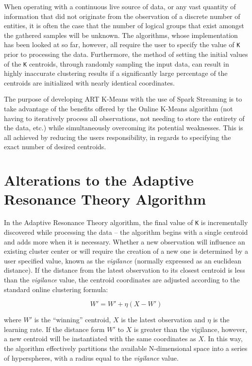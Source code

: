 \documentclass{l4proj}
\begin{document}
When operating with a continuous live source of data, or any vast quantity of information that did not originate from the observation of a discrete number of entities, it is often the case that the number of logical groups that exist amongst the gathered samples will be unknown. The algorithms, whose implementation has been looked at so far, however, all require the user to specify the value of \texttt{K} prior to processing the data. Furthermore, the method of setting the initial values of the \texttt{K} centroids, through randomly sampling the input data, can result in highly inaccurate clustering results if a significantly large percentage of the centroids are  initialized with nearly identical coordinates\cite{PlusPlus}.

The purpose of developing ART K-Means with the use of Spark Streaming is to take advantage of the benefits offered by the Online K-Means algorithm (not having to iteratively process all observations, not needing to store the entirety of the data, etc.) while simultaneously overcoming its potential weaknesses. This is all achieved by reducing the users responsibility, in regards to specifying the exact number of desired centroids.

\section{Alterations to the Adaptive Resonance Theory Algorithm}

In the Adaptive Resonance Theory algorithm, the final value of \texttt{K} is incrementally discovered while processing the data -- the algorithm begins with a single centroid and adds more when it is necessary. Whether a new observation will influence an existing cluster center or will require the creation of a new one is determined by a user specified value, known as the \textit{vigilance} (normally expressed as an euclidean distance). If the distance from the latest observation to its closest centroid is less than the \textit{vigilance} value, the centroid coordinates are adjusted according to the standard online clustering formula:

$$W' = W' + \eta(X - W')$$

\noindent where $W'$ is the ``winning'' centroid, $X$ is the latest observation and $\eta$ is the learning rate. If the distance form $W'$ to $X$ is greater than the vigilance, however, a new centroid will be instantiated with the same coordinates as $X$. In this way, the algorithm effectively partitions the available N-dimensional space into a series of hyperspheres, with a radius equal to the \textit{vigilance} value.
\end{document}
